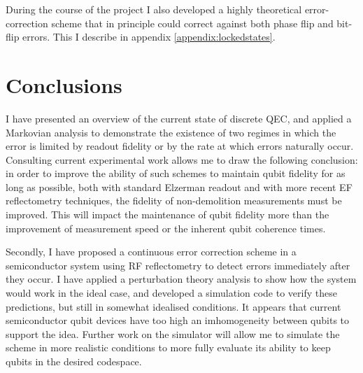 \documentclass{report}
\begin{document}
During the course of the project I also developed a highly theoretical error-correction scheme that in principle could correct against both phase flip and bit-flip errors. This I describe in appendix \ref{appendix:lockedstates}.

\chapter{Conclusions}
I have presented an overview of the current state of discrete QEC, and applied a Markovian analysis to demonstrate the existence of two regimes in which the error is limited by readout fidelity or by the rate at which errors naturally occur. Consulting current experimental work allows me to draw the following conclusion: in order to improve the ability of such schemes to maintain qubit fidelity for as long as possible, both with standard Elzerman readout and with more recent EF reflectometry techniques, the fidelity of non-demolition measurements must be improved. This will impact the maintenance of qubit fidelity more than the improvement of measurement speed or the inherent qubit coherence times.

Secondly, I have proposed a continuous error correction scheme in a semiconductor system using RF reflectometry to detect errors immediately after they occur. I have applied a perturbation theory analysis to show how the system would work in the ideal case, and developed a simulation code to verify these predictions, but still in somewhat idealised conditions. It appears that current semiconductor qubit devices have too high an imhomogeneity between qubits to support the idea. Further work on the simulator will allow me to simulate the scheme in more realistic conditions to more fully evaluate its ability to keep qubits in the desired codespace.
\end{document}
